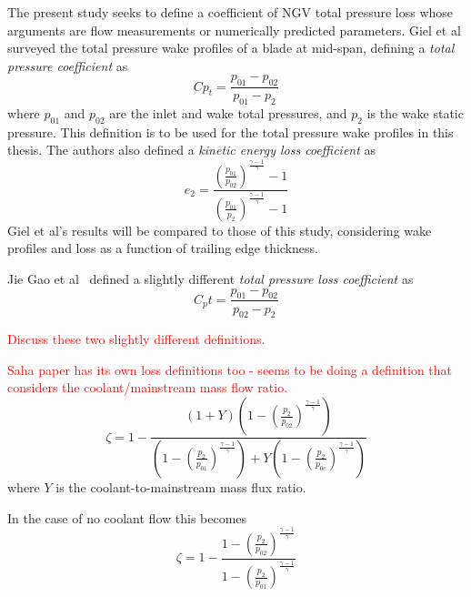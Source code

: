 \documentclass[a4paper, 11pt, oneside]{report}
\begin{document}
The present study seeks to define a coefficient of NGV total pressure loss whose arguments are flow measurements or numerically predicted parameters. Giel et al surveyed the total pressure wake profiles of a blade at mid-span, defining a \textit{total pressure coefficient} as
\begin{equation}
Cp_t = \frac{
p_{01} - p_{02}
}{
p_{01} - p_2
}
\end{equation}
where $p_{01}$ and $p_{02}$ are the inlet and wake total pressures, and $p_2$ is the wake static pressure. This definition is to be used for the total pressure wake profiles in this thesis. The authors also defined a \textit{kinetic energy loss coefficient} as
\begin{equation}
e_2 = \frac{ 
\left( \frac{p_{01}}{p_{02}} \right)^\frac{\gamma-1}{ \gamma } - 1 
}{
\left( \frac{p_{01}}{p_{2}} \right)^\frac{\gamma-1}{ \gamma } - 1 
}
\end{equation}
Giel et al's results will be compared to those of this study, considering wake profiles and loss as a function of trailing edge thickness.

Jie Gao et al~\cite{gao_te} defined a slightly different \textit{total pressure loss coefficient} as
\begin{equation}
C_pt = \frac{
p_{01} - p_{02}
}{
p_{02} - p_2
}
\end{equation}

\textcolor{red}{Discuss these two slightly different definitions.}


 
\textcolor{red}{Saha paper has its own loss definitions too - seems to be doing a definition that considers the coolant/mainstream mass flow ratio.}
\begin{equation}
\zeta = 
1 -
\frac{ 
	\left( 1 + Y \right) 
	\left(
		1 -
		\left(
			\frac{p_2}{p_{02}}
		\right)
		^\frac{\gamma-1}{\gamma}
	\right)
}{
	\left(
		1 -
		\left(
			\frac{p_2}{p_{01}}
		\right)
		^\frac{\gamma-1}{\gamma}
	\right)
	+Y
	\left(
		1 -
		\left(
			\frac{p_2}{p_{0c}}
		\right)
		^\frac{\gamma-1}{\gamma}
	\right)
}
\end{equation}
where $Y$ is the coolant-to-mainstream mass flux ratio.

In the case of no coolant flow this becomes
\begin{equation}
\zeta = 
1 -
\frac{ 
		1 -
		\left(
			\frac{p_2}{p_{02}}
		\right)
		^\frac{\gamma-1}{\gamma}
}{
		1 -
		\left(
			\frac{p_2}{p_{01}}
		\right)
		^\frac{\gamma-1}{\gamma}
}
\end{equation}
\end{document}
